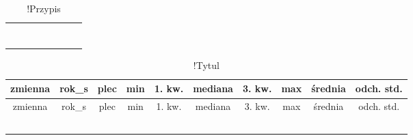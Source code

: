 
\begin{table}[H]
\begin{tabularx}{\textwidth}{@{\hspace{1.7 mm}}Xccccccc@{\hspace{1.7 mm}}}
\midrule
&   &   &   &   &   &   &   \\ \bottomrule
&   &   &   &   &   &   &   \\
&   &   &   &   &   &   &   \\
&   &   &   &   &   &   &   \\
&   &   &   &   &   &   &   \\
&   &   &   &   &   &   &   \\
&   &   &   &   &   &   &   \\
&   &   &   &   &   &   &   \\ \toprule
\end{tabularx}
\caption*{!Przypis}
\end{table}


\begin{longtable}[c]{@{}cccccccccc@{}}
\caption{!Tytul}\tabularnewline
\toprule
zmienna & rok\_s & plec & min & 1. kw. & mediana & 3. kw. & max &
średnia & odch. std.\tabularnewline
\midrule
\endfirsthead
\toprule
zmienna & rok\_s & plec & min & 1. kw. & mediana & 3. kw. & max &
średnia & odch. std.\tabularnewline
\midrule
\endhead
 &  &  &  &  &  &  &  &  & \tabularnewline
 &  &  &  &  &  &  &  &  & \tabularnewline
 &  &  &  &  &  &  &  &  & \tabularnewline
 &  &  &  &  &  &  &  &  & \tabularnewline
 &  &  &  &  &  &  &  &  & \tabularnewline
\end{longtable}



